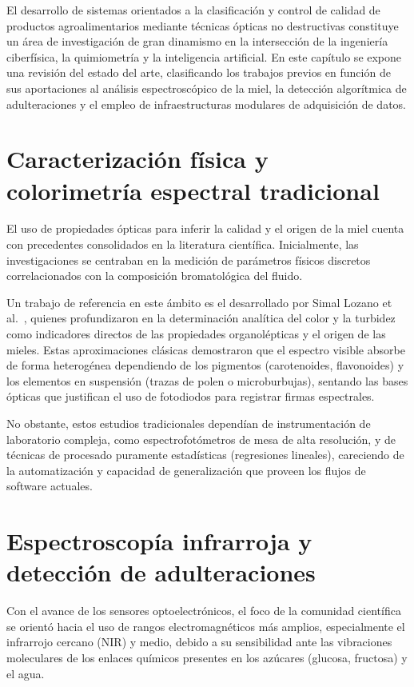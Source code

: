 
El desarrollo de sistemas orientados a la clasificación y control de calidad de productos agroalimentarios mediante técnicas ópticas no destructivas constituye un área de investigación de gran dinamismo en la intersección de la ingeniería ciberfísica, la quimiometría y la inteligencia artificial. En este capítulo se expone una revisión del estado del arte, clasificando los trabajos previos en función de sus aportaciones al análisis espectroscópico de la miel, la detección algorítmica de adulteraciones y el empleo de infraestructuras modulares de adquisición de datos.

\section{Caracterización física y colorimetría espectral tradicional}

El uso de propiedades ópticas para inferir la calidad y el origen de la miel cuenta con precedentes consolidados en la literatura científica. Inicialmente, las investigaciones se centraban en la medición de parámetros físicos discretos correlacionados con la composición bromatológica del fluido. 

Un trabajo de referencia en este ámbito es el desarrollado por Simal Lozano et al.~\cite{simal1991color}, quienes profundizaron en la determinación analítica del color y la turbidez como indicadores directos de las propiedades organolépticas y el origen de las mieles. Estas aproximaciones clásicas demostraron que el espectro visible absorbe de forma heterogénea dependiendo de los pigmentos (carotenoides, flavonoides) y los elementos en suspensión (trazas de polen o microburbujas), sentando las bases ópticas que justifican el uso de fotodiodos para registrar firmas espectrales. 

No obstante, estos estudios tradicionales dependían de instrumentación de laboratorio compleja, como espectrofotómetros de mesa de alta resolución, y de técnicas de procesado puramente estadísticas (regresiones lineales), careciendo de la automatización y capacidad de generalización que proveen los flujos de software actuales.

\section{Espectroscopía infrarroja y detección de adulteraciones}

Con el avance de los sensores optoelectrónicos, el foco de la comunidad científica se orientó hacia el uso de rangos electromagnéticos más amplios, especialmente el infrarrojo cercano (NIR) y medio, debido a su sensibilidad ante las vibraciones moleculares de los enlaces químicos presentes en los azúcares (glucosa, fructosa) y el agua.

